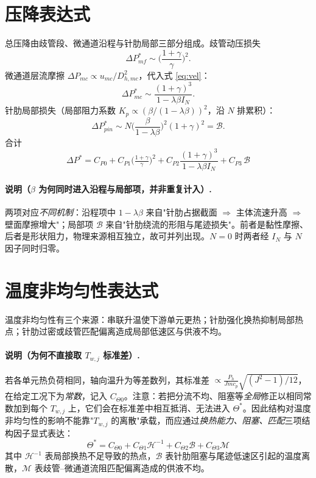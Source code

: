\documentclass[UTF8,a4paper,12pt]{ctexart}
\numberwithin{equation}{section}
\begin{document}
\section{压降表达式}

总压降由歧管段、微通道沿程与针肋局部三部分组成。歧管动压损失
\begin{equation}
    \Delta P_{mf}^*\sim\Big(\frac{1+\gamma}{\gamma}\Big)^2 .
\end{equation}
微通道层流摩擦 $\Delta P_{mc}\propto u_{mc}/D_{h,mc}^2$，代入式 \eqref{eq:vel}：
\begin{equation}
    \Delta P_{mc}^*\sim\frac{(1+\gamma)^3}{1-\lambda\beta I_N}.
\end{equation}
针肋局部损失（局部阻力系数 $K_p\propto(\beta/(1-\lambda\beta))^2$，沿 $N$ 排累积）：
\begin{equation}
    \Delta P_{pin}^*\sim N\Big(\frac{\beta}{1-\lambda\beta}\Big)^2(1+\gamma)^2=\mathcal B .
\end{equation}
合计
\begin{equation}
    \boxed{\;
    \Delta P^*=C_{P0}+C_{P1}\Big(\tfrac{1+\gamma}{\gamma}\Big)^2
    +C_{P2}\frac{(1+\gamma)^3}{1-\lambda\beta I_N}
    +C_{P3}\,\mathcal B
    \;}
    \label{eq:Pstar}
\end{equation}

\paragraph{说明（$\beta$ 为何同时进入沿程与局部项，并非重复计入）.}两项对应\emph{不同机制}：沿程项中 $1-\lambda\beta$ 来自"针肋占据截面 $\Rightarrow$ 主体流速升高 $\Rightarrow$ 壁面摩擦增大"；局部项 $\mathcal B$ 来自"针肋绕流的形阻与尾迹损失"。前者是黏性摩擦、后者是形状阻力，物理来源相互独立，故可并列出现。$N=0$ 时两者经 $I_N$ 与 $N$ 因子同时归零。

\section{温度非均匀性表达式}

温度非均匀性有三个来源：串联升温使下游单元更热；针肋强化换热抑制局部热点；针肋过密或歧管匹配偏离造成局部低速区与供液不均。

\paragraph{说明（为何不直接取 $T_{w,j}$ 标准差）.}若各单元热负荷相同，轴向温升为等差数列，其标准差
$\propto\frac{P_h}{J\dot m c_p}\sqrt{(J^2-1)/12}$，在给定工况下为\emph{常数}，记入 $C_{\Theta0}$。注意：若把分流不均、阻塞等\emph{全局}修正以相同常数加到每个 $T_{w,j}$ 上，它们会在标准差中相互抵消、无法进入 $\Theta^*$。因此结构对温度非均匀性的影响不能靠"$T_{w,j}$ 的离散"承载，而应通过\emph{换热能力、阻塞、匹配}三项结构因子显式表达：
\begin{equation}
    \boxed{\;
    \Theta^*=C_{\Theta0}+C_{\Theta1}\mathcal H^{-1}+C_{\Theta2}\mathcal B+C_{\Theta3}\mathcal M
    \;}
    \label{eq:Tstar}
\end{equation}
其中 $\mathcal H^{-1}$ 表局部换热不足导致的热点，$\mathcal B$ 表针肋阻塞与尾迹低速区引起的温度离散，$\mathcal M$ 表歧管--微通道流阻匹配偏离造成的供液不均。
\end{document}
